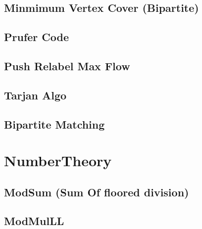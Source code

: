 \subsection{Minmimum Vertex Cover (Bipartite)}
\vspace{-2ex}
\raggedbottom
\vspace{-3.2ex}
\hrulefill
\subsection{Prufer Code}
\vspace{-2ex}
\raggedbottom
\vspace{-3.2ex}
\hrulefill
\subsection{Push Relabel Max Flow}
\vspace{-2ex}
\raggedbottom
\vspace{-3.2ex}
\hrulefill
\subsection{Tarjan Algo}
\vspace{-2ex}
\raggedbottom
\vspace{-3.2ex}
\hrulefill
\subsection{Bipartite Matching}
\vspace{-2ex}
\raggedbottom
\vspace{-3.2ex}
\hrulefill

\section{NumberTheory}
\subsection{ModSum (Sum Of floored division)}
\vspace{-2ex}
\raggedbottom
\vspace{-3.2ex}
\hrulefill
\subsection{ModMulLL}
\vspace{-2ex}
\raggedbottom
\vspace{-3.2ex}
\hrulefill
